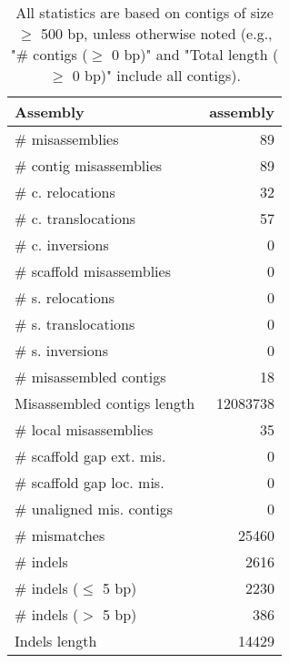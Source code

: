 \documentclass[12pt,a4paper]{article}
\begin{document}
\begin{table}[ht]
\begin{center}
\caption{All statistics are based on contigs of size $\geq$ 500 bp, unless otherwise noted (e.g., "\# contigs ($\geq$ 0 bp)" and "Total length ($\geq$ 0 bp)" include all contigs).}
\begin{tabular}{|l*{1}{|r}|}
\hline
Assembly & assembly \\ \hline
\# misassemblies & 89 \\ \hline
\hspace{2mm}\# contig misassemblies & 89 \\ \hline
\hspace{5mm}\# c. relocations & 32 \\ \hline
\hspace{5mm}\# c. translocations & 57 \\ \hline
\hspace{5mm}\# c. inversions & 0 \\ \hline
\hspace{2mm}\# scaffold misassemblies & 0 \\ \hline
\hspace{5mm}\# s. relocations & 0 \\ \hline
\hspace{5mm}\# s. translocations & 0 \\ \hline
\hspace{5mm}\# s. inversions & 0 \\ \hline
\# misassembled contigs & 18 \\ \hline
Misassembled contigs length & 12083738 \\ \hline
\# local misassemblies & 35 \\ \hline
\# scaffold gap ext. mis. & 0 \\ \hline
\# scaffold gap loc. mis. & 0 \\ \hline
\# unaligned mis. contigs & 0 \\ \hline
\# mismatches & 25460 \\ \hline
\# indels & 2616 \\ \hline
\hspace{5mm}\# indels ($\leq$ 5 bp) & 2230 \\ \hline
\hspace{5mm}\# indels ($>$ 5 bp) & 386 \\ \hline
Indels length & 14429 \\ \hline
\end{tabular}
\end{center}
\end{table}
\end{document}
